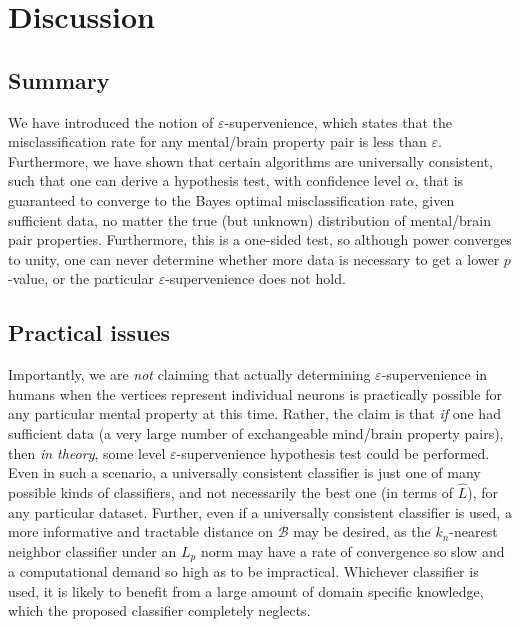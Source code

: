 \documentclass{article}
\newcommand{\mB}{\mathcal{B}}
\newcommand{\eps}{\varepsilon}
\providecommand{\mh}[1]{\widehat{#1}}
\begin{document}






\section{Discussion}

\subsection{Summary} %
\label{par:summary}

We have introduced the notion of $\eps$-supervenience, which states that the misclassification rate for any mental/brain property pair is less than $\eps$.  Furthermore, we have shown that certain algorithms are universally consistent, such that one can derive a hypothesis test, with confidence level $\alpha$, that is guaranteed to converge to the Bayes optimal misclassification rate, given sufficient data, no matter the true (but unknown) distribution of mental/brain pair properties.  Furthermore, this is a one-sided test, so although power converges to unity, one can never determine whether more data is necessary to get a lower $p$-value, or the particular $\eps$-supervenience does not hold.  

\subsection{Practical issues} %
\label{par:practical_issues}

Importantly, we are \emph{not} claiming that actually determining $\eps$-supervenience in humans when the vertices represent individual neurons is practically possible for any particular mental property at this time.  Rather, the claim is that \emph{if} one had sufficient data (a very large number of exchangeable mind/brain property pairs), then \emph{in theory}, some level $\eps$-supervenience hypothesis test could be performed.  Even in such a scenario, a universally consistent classifier is just one of many possible kinds of classifiers, and not necessarily the best one (in terms of $\mh{L}$), for any particular dataset.  Further, even if a universally consistent classifier is used, a more informative and tractable distance on $\mB$ may be desired, as the $k_n$-nearest neighbor classifier under an $L_p$ norm may have a rate of convergence so slow and a computational demand so high as to be impractical.  Whichever classifier is used, it is likely to benefit from a large amount of domain specific knowledge, which the proposed classifier completely neglects.
\end{document}
